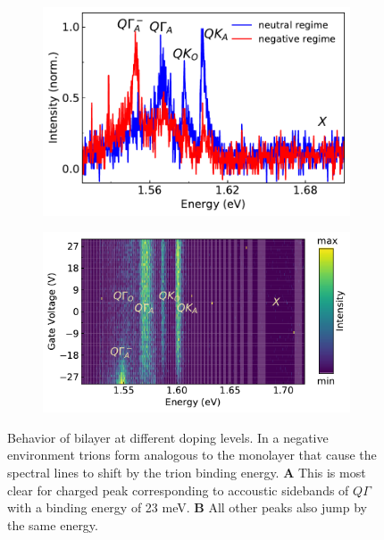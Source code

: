 \begin{figure}[t]
	\begin{subfigure}{0.49\textwidth}
		\caption{}
		\includegraphics[height=0.65\textwidth]{BL_lowhigh}
	\end{subfigure}
	\begin{subfigure}{0.49\textwidth}
		\caption{}
		\includegraphics[height=0.65\textwidth]{BL_sweep}
	\end{subfigure}
	\caption{Behavior of bilayer \wse at different doping levels. In a negative environment trions form analogous to the monolayer that cause the spectral lines to shift by the trion binding energy. \textbf{A} This is most clear for charged peak corresponding to accoustic sidebands of $Q\Gamma$ with a binding energy of 23 meV. \textbf{B} All other peaks also jump by the same energy.} 
	\label{bilayervoltsweep}
\end{figure}

